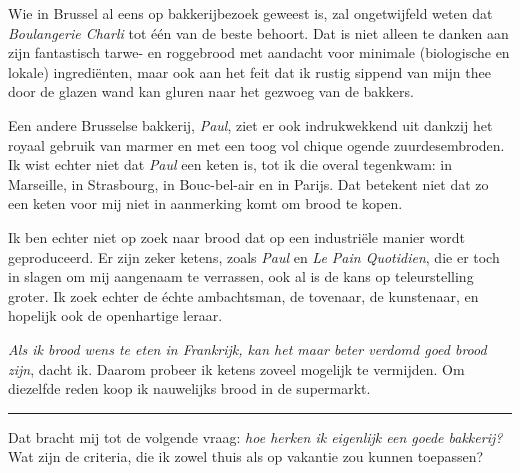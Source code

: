 \documentclass[
  11pt,
  dutch,
]{memoir}
\begin{document}
Wie in Brussel al eens op bakkerijbezoek geweest is, zal ongetwijfeld
weten dat \emph{Boulangerie Charli} tot één van de beste behoort. Dat is
niet alleen te danken aan zijn fantastisch tarwe- en roggebrood met
aandacht voor minimale (biologische en lokale) ingrediënten, maar ook
aan het feit dat ik rustig sippend van mijn thee door de glazen wand kan
gluren naar het gezwoeg van de bakkers.

Een andere Brusselse bakkerij, \emph{Paul}, ziet er ook indrukwekkend
uit dankzij het royaal gebruik van marmer en met een toog vol chique
ogende zuurdesembroden. Ik wist echter niet dat \emph{Paul} een keten
is, tot ik die overal tegenkwam: in Marseille, in Strasbourg, in
Bouc-bel-air en in Parijs. Dat betekent niet dat zo een keten voor mij
niet in aanmerking komt om brood te kopen.

Ik ben echter niet op zoek naar brood dat op een industriële manier
wordt geproduceerd. Er zijn zeker ketens, zoals \emph{Paul} en \emph{Le
Pain Quotidien}, die er toch in slagen om mij aangenaam te verrassen,
ook al is de kans op teleurstelling groter. Ik zoek echter de échte
ambachtsman, de tovenaar, de kunstenaar, en hopelijk ook de openhartige
leraar.

\emph{Als ik brood wens te eten in Frankrijk, kan het maar beter verdomd
goed brood zijn}, dacht ik. Daarom probeer ik ketens zoveel mogelijk te
vermijden. Om diezelfde reden koop ik nauwelijks brood in de supermarkt.

\pfbreak

Dat bracht mij tot de volgende vraag: \emph{hoe herken ik eigenlijk een
goede bakkerij?} Wat zijn de criteria, die ik zowel thuis als op
vakantie zou kunnen toepassen?
\end{document}
